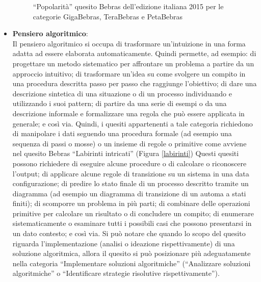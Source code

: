 \documentclass[12pt]{report}
\begin{document}
\begin{itemize}
	\begin{figure}[h]
	\centering
	\caption{``Popolarità'' quesito Bebras dell'edizione italiana 2015 per le categorie GigaBebras, TeraBebras e PetaBebras}\label{2015-CA-01}
	\end{figure}
	
\bigskip
	\item \textbf{Pensiero algoritmico}: 
	\\
	Il pensiero algoritmico si occupa di trasformare un'intuizione in una forma adatta ad essere elaborata automaticamente. Quindi permette, ad esempio: di progettare un metodo sistematico per affrontare un problema a partire da un approccio intuitivo; di trasformare un'idea su come svolgere un compito in una procedura descritta passo per passo che raggiunge l'obiettivo; di dare una descrizione sintetica di una situazione o di un processo individuando e utilizzando i suoi pattern; di partire da una serie di esempi o da una descrizione informale e formalizzare una regola che può essere applicata in generale; e così via.
	Quindi, i quesiti appartenenti a tale categoria richiedono di manipolare i dati seguendo una procedura formale (ad esempio una sequenza di passi o mosse) o un insieme di regole o primitive come avviene nel quesito Bebras ``Labirinti intricati'' (Figura \ref{labirinti})
	Questi quesiti possono richiedere di eseguire alcune procedure o di calcolare o riconoscere l'output; di applicare alcune regole di transizione su un sistema in una data configurazione; di predire lo stato finale di un processo descritto tramite un diagramma (ad esempio un diagramma di transizione di un automa a stati finiti); di scomporre un problema in più parti; di combinare delle operazioni primitive per calcolare un risultato o di concludere un compito; di enumerare sistematicamente o esaminare tutti i possibili casi che possono presentarsi in un dato contesto; e così via.
	Si può notare che quando lo scopo del quesito riguarda l'implementazione (analisi o ideazione rispettivamente) di una soluzione algoritmica, allora il quesito si può posizionare più adeguatamente nella categoria ``Implementare soluzioni algoritmiche'' (``Analizzare soluzioni algoritmiche'' o ``Identificare strategie risolutive rispettivamente'').
	

\end{itemize}
\end{document}
